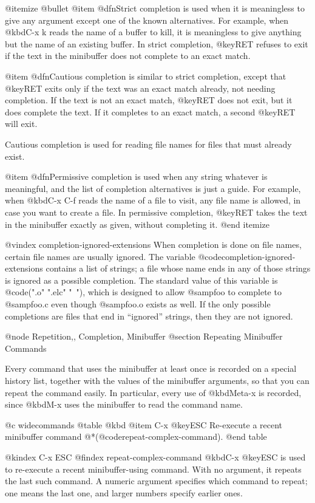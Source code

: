 {{{{{@itemize @bullet
@item
@dfn{Strict} completion is used when it is meaningless to give any
argument except one of the known alternatives.  For example, when
@kbd{C-x k} reads the name of a buffer to kill, it is meaningless to
give anything but the name of an existing buffer.  In strict
completion, @key{RET} refuses to exit if the text in the minibuffer
does not complete to an exact match.

@item
@dfn{Cautious} completion is similar to strict completion, except that
@key{RET} exits only if the text was an exact match already, not
needing completion.  If the text is not an exact match, @key{RET} does
not exit, but it does complete the text.  If it completes to an exact
match, a second @key{RET} will exit.

Cautious completion is used for reading file names for files that must
already exist.

@item
@dfn{Permissive} completion is used when any string whatever is
meaningful, and the list of completion alternatives is just a guide.
For example, when @kbd{C-x C-f} reads the name of a file to visit, any
file name is allowed, in case you want to create a file.  In
permissive completion, @key{RET} takes the text in the minibuffer
exactly as given, without completing it.
@end itemize

@vindex completion-ignored-extensions
  When completion is done on file names, certain file names are usually
ignored.  The variable @code{completion-ignored-extensions} contains a list
of strings; a file whose name ends in any of those strings is ignored as a
possible completion.  The standard value of this variable is @code{(".o"
".elc" "~")}, which is designed to allow @samp{foo} to complete to
@samp{foo.c} even though @samp{foo.o} exists as well.  If the only possible
completions are files that end in ``ignored'' strings, then they are not
ignored.

@node Repetition,, Completion, Minibuffer
@section Repeating Minibuffer Commands

  Every command that uses the minibuffer at least once is recorded on a
special history list, together with the values of the minibuffer arguments,
so that you can repeat the command easily.  In particular, every
use of @kbd{Meta-x} is recorded, since @kbd{M-x} uses the minibuffer to
read the command name.

@c widecommands
@table @kbd
@item C-x @key{ESC}
Re-execute a recent minibuffer command @*(@code{repeat-complex-command}).
@end table

@kindex C-x ESC
@findex repeat-complex-command
  @kbd{C-x @key{ESC}} is used to re-execute a recent minibuffer-using
command.  With no argument, it repeats the last such command.  A numeric
argument specifies which command to repeat; one means the last one, and
larger numbers specify earlier ones.

}}}}}
